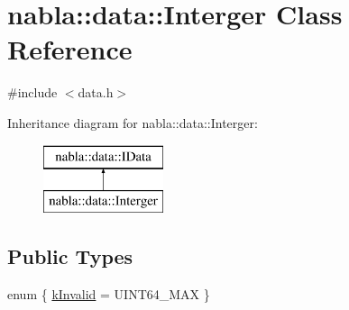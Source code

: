 \hypertarget{classnabla_1_1data_1_1_interger}{}\section{nabla\+::data\+::Interger Class Reference}
\label{classnabla_1_1data_1_1_interger}


{\ttfamily \#include $<$data.\+h$>$}

Inheritance diagram for nabla\+::data\+::Interger\+:\begin{figure}[H]
\begin{center}
\leavevmode
\includegraphics[height=2.000000cm]{classnabla_1_1data_1_1_interger}
\end{center}
\end{figure}
\subsection*{Public Types}
\begin{DoxyCompactItemize}
\item 
enum \{ \mbox{\hyperlink{classnabla_1_1data_1_1_interger_aa460020920651f32af7c721750062aaea6918a80a5fe08190c038766aad17c993}{k\+Invalid}} = U\+I\+N\+T64\+\_\+\+M\+AX
 \}
\end{DoxyCompactItemize}
